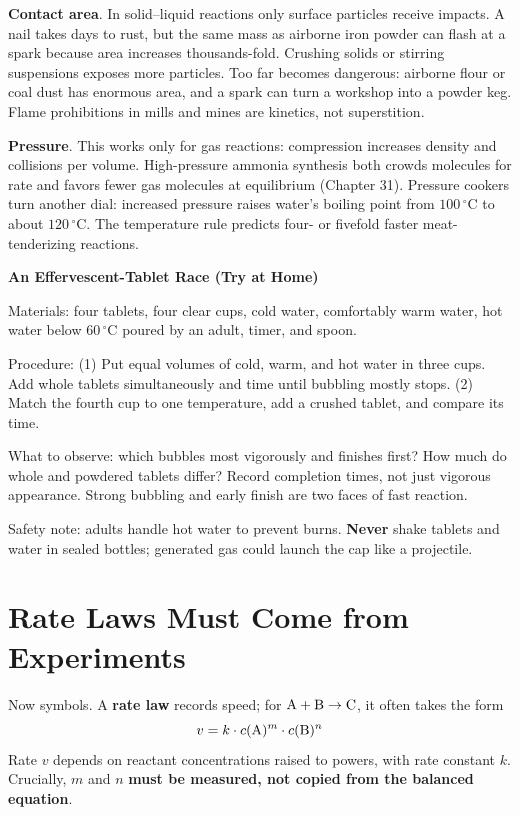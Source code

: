 \textbf{Contact area}. In solid--liquid reactions only surface particles receive impacts. A nail takes days to rust, but the same mass as airborne iron powder can flash at a spark because area increases thousands-fold. Crushing solids or stirring suspensions exposes more particles. Too far becomes dangerous: airborne flour or coal dust has enormous area, and a spark can turn a workshop into a powder keg. Flame prohibitions in mills and mines are kinetics, not superstition.

\textbf{Pressure}. This works only for gas reactions: compression increases density and collisions per volume. High-pressure ammonia synthesis both crowds molecules for rate and favors fewer gas molecules at equilibrium (Chapter 31). Pressure cookers turn another dial: increased pressure raises water's boiling point from $100\,^{\circ}\mathrm{C}$ to about $120\,^{\circ}\mathrm{C}$. The temperature rule predicts four- or fivefold faster meat-tenderizing reactions.

\begin{shiyan}
\textbf{An Effervescent-Tablet Race (Try at Home)}

Materials: four tablets, four clear cups, cold water, comfortably warm water, hot water below $60\,^{\circ}\mathrm{C}$ poured by an adult, timer, and spoon.

Procedure: (1) Put equal volumes of cold, warm, and hot water in three cups. Add whole tablets simultaneously and time until bubbling mostly stops. (2) Match the fourth cup to one temperature, add a crushed tablet, and compare its time.

What to observe: which bubbles most vigorously and finishes first? How much do whole and powdered tablets differ? Record completion times, not just vigorous appearance. Strong bubbling and early finish are two faces of fast reaction.

Safety note: adults handle hot water to prevent burns. \textbf{Never} shake tablets and water in sealed bottles; generated gas could launch the cap like a projectile.
\end{shiyan}

\section{Rate Laws Must Come from Experiments}

Now symbols. A \textbf{rate law} records speed; for $\mathrm{A} + \mathrm{B} \rightarrow \mathrm{C}$, it often takes the form
\[v = k \cdot c(\mathrm{A})^{m} \cdot c(\mathrm{B})^{n}\]
Rate $v$ depends on reactant concentrations raised to powers, with rate constant $k$. Crucially, $m$ and $n$ \textbf{must be measured, not copied from the balanced equation}.

